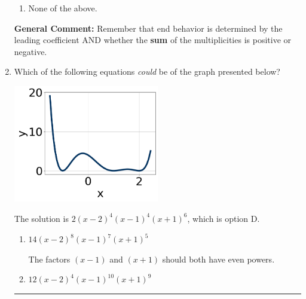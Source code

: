 \documentclass{extbook}[14pt]
\newcommand{\litem}[1]{\item #1

\rule{\textwidth}{0.4pt}}
\begin{document}
\begin{enumerate}
{\begin{enumerate}[label=\Alph*.]
\item None of the above.\end{enumerate}
\textbf{General Comment:} Remember that end behavior is determined by the leading coefficient AND whether the \textbf{sum} of the multiplicities is positive or negative.
}
\litem{
Which of the following equations \textit{could} be of the graph presented below?

\begin{center}
    \includegraphics[width=0.5\textwidth]{../Figures/polyGraphToFunctionCopyB.png}
\end{center}


The solution is \( 2(x - 2)^{4} (x - 1)^{4} (x + 1)^{6} \), which is option D.\begin{enumerate}[label=\Alph*.]
\item \( 14(x - 2)^{8} (x - 1)^{7} (x + 1)^{5} \)

The factors $(x - 1)$ and $(x + 1)$ should both have even powers.
\item \( 12(x - 2)^{4} (x - 1)^{10} (x + 1)^{9} \)


\end{enumerate}}
\end{enumerate}
\end{document}
